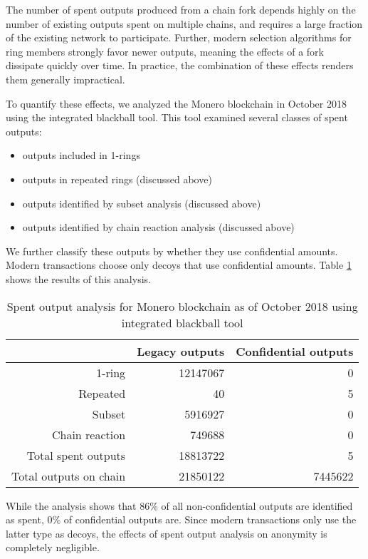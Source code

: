 \documentclass{mrl}
\begin{document}
The number of spent outputs produced from a chain fork depends highly on the number of existing outputs spent on multiple chains, and requires a large fraction of the existing network to participate. Further, modern selection algorithms for ring members strongly favor newer outputs, meaning the effects of a fork dissipate quickly over time. In practice, the combination of these effects renders them generally impractical.

To quantify these effects, we analyzed the Monero blockchain in October 2018 using the integrated blackball tool. This tool examined several classes of spent outputs:
\begin{itemize}
\item outputs included in 1-rings
\item outputs in repeated rings (discussed above)
\item outputs identified by subset analysis (discussed above)
\item outputs identified by chain reaction analysis (discussed above)
\end{itemize}
We further classify these outputs by whether they use confidential amounts. Modern transactions choose only decoys that use confidential amounts. Table \ref{table:spent} shows the results of this analysis.

\begin{table}[ht]
\begin{center}
\begin{tabular}{rrr}
& Legacy outputs & Confidential outputs \\
\hline
1-ring & 12147067 & 0 \\
Repeated & 40 & 5 \\
Subset & 5916927 & 0 \\
Chain reaction & 749688 & 0 \\
\hline
Total spent outputs & 18813722 & 5 \\
Total outputs on chain & 21850122 & 7445622 \\
\end{tabular}
\caption{Spent output analysis for Monero blockchain as of October 2018 using integrated blackball tool}
\label{table:spent}
\end{center}
\end{table}

While the analysis shows that 86\% of all non-confidential outputs are identified as spent, 0\% of confidential outputs are. Since modern transactions only use the latter type as decoys, the effects of spent output analysis on anonymity is completely negligible.
\end{document}
